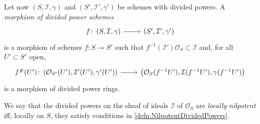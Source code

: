 \begin{defn}
	Let now $\left(S, \mathcal{I}, \gamma\right)$ and $\left(S', \mathcal{I}', \gamma'\right)$
	be schemes with divided powers.
	A \emph{morphism of divided power schemes}
	\begin{equation*}
	\begin{tikzcd}[row sep = 0ex
		,/tikz/column 1/.append style={anchor=base east}
		,/tikz/column 2/.append style={anchor=base west}]
		f\colon \left(S, \mathcal{I}, \gamma\right) \arrow[r, "", rightarrow] &
		\left(S', \mathcal{I}', \gamma'\right)
	\end{tikzcd}
	\end{equation*} 
	is a morphism of schemes
	$f\colon S \to S'$ such that
	$f^{-1}(\mathcal{I}') \mathcal{O}_S \subset \mathcal{I}$
	and, for all $U' \subset S'$ open,
	\begin{equation*}
	\begin{tikzcd}[row sep = 0ex
		,/tikz/column 1/.append style={anchor=base east}
		,/tikz/column 2/.append style={anchor=base west}]
		f^\#(U')\colon 
		\left(\mathcal{O}_{S'}(U'), \mathcal{I}'(U'), \gamma'(U')\right)
		\arrow[r, "", rightarrow] &
		\left(\mathcal{O}_{ S }(f^{-1}U'), \mathcal{I}(f^{-1}U'), \gamma(f^{-1}U')\right)
	\end{tikzcd}
	\end{equation*} 
	is a morphism of divided power rings.
\end{defn}


\begin{defn}
	We say that the divided powers on the sheaf of ideals $\mathcal{I}$
	of $\mathcal{O}_{ S }$ are \emph{locally nilpotent} iff,
	locally on $S$, they satisfy conditions in \cref{defn:NilpotentDividedPowers}.
\end{defn}


